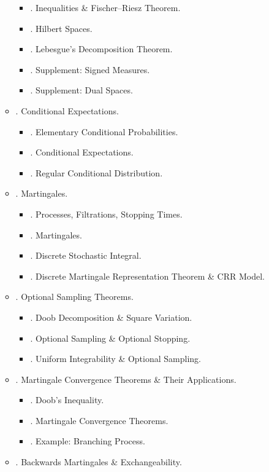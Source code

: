 \documentclass{article}
\begin{document}
\begin{enumerate}
\begin{itemize}
\begin{itemize}
			\item {. Inequalities \& Fischer--Riesz Theorem.}
			\item {. Hilbert Spaces.}
			\item {. Lebesgue's Decomposition Theorem.}
			\item {. Supplement: Signed Measures.}
			\item {. Supplement: Dual Spaces.}
		\end{itemize}
		\item {. Conditional Expectations.}
		\begin{itemize}
			\item {. Elementary Conditional Probabilities.}
			\item {. Conditional Expectations.}
			\item {. Regular Conditional Distribution.}
		\end{itemize}
		\item {. Martingales.}
		\begin{itemize}
			\item {. Processes, Filtrations, Stopping Times.}
			\item {. Martingales.}
			\item {. Discrete Stochastic Integral.}
			\item {. Discrete Martingale Representation Theorem \& CRR Model.}
		\end{itemize}
		\item {. Optional Sampling Theorems.}
		\begin{itemize}
			\item {. Doob Decomposition \& Square Variation.}
			\item {. Optional Sampling \& Optional Stopping.}
			\item {. Uniform Integrability \& Optional Sampling.}
		\end{itemize}
		\item {. Martingale Convergence Theorems \& Their Applications.}
		\begin{itemize}
			\item {. Doob's Inequality.}
			\item {. Martingale Convergence Theorems.}
			\item {. Example: Branching Process.}
		\end{itemize}
		\item {. Backwards Martingales \& Exchangeability.}

\end{itemize}
\end{enumerate}
\end{document}
